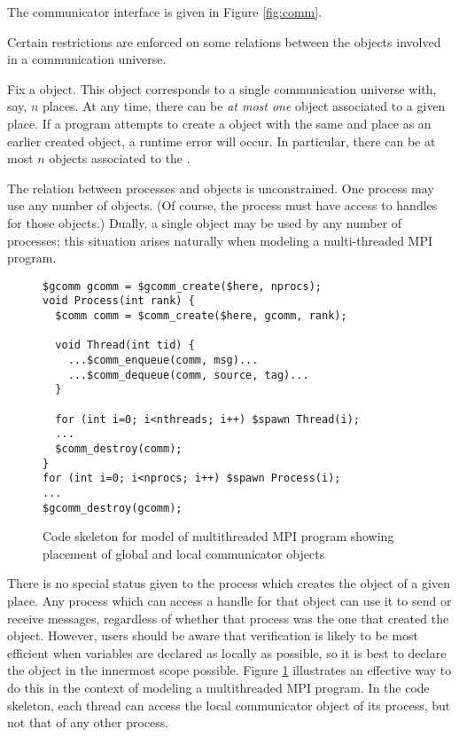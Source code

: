 The communicator interface is given in Figure \ref{fig:comm}.

Certain restrictions are enforced on some relations between the
objects involved in a communication universe.

Fix a \cgcomm{} object.  This object corresponds to a single
communication universe with, say, $n$ places.  At any time, there can
be \emph{at most one} \ccomm{} object associated to a given place.  If
a program attempts to create a \ccomm{} object with the same \cgcomm{}
and place as an earlier created \ccomm{} object, a runtime error will
occur.  In particular, there can be at most $n$ \ccomm{} objects
associated to the \cgcomm.

The relation between processes and \ccomm{} objects is unconstrained.
One process may use any number of \ccomm{} objects.  (Of course, the
process must have access to handles for those \ccomm{} objects.)
Dually, a single \ccomm{} object may be used by any number of
processes; this situation arises naturally when modeling a
multi-threaded MPI program.

\begin{figure}
  \begin{small}
\begin{verbatim}
$gcomm gcomm = $gcomm_create($here, nprocs);
void Process(int rank) {
  $comm comm = $comm_create($here, gcomm, rank);

  void Thread(int tid) {
    ...$comm_enqueue(comm, msg)...
    ...$comm_dequeue(comm, source, tag)...
  }

  for (int i=0; i<nthreads; i++) $spawn Thread(i);
  ...
  $comm_destroy(comm);
}
for (int i=0; i<nprocs; i++) $spawn Process(i);
...
$gcomm_destroy(gcomm);
\end{verbatim}
  \end{small}
  \caption{Code skeleton for model of multithreaded MPI program
    showing placement of global and local communicator objects}
  \label{fig:mpi-threads-comm}
\end{figure}

There is no special status given to the process which creates the
\ccomm{} object of a given place.  Any process which can access a
handle for that \ccomm{} object can use it to send or receive
messages, regardless of whether that process was the one that created
the \ccomm{} object.  However, users should be aware that verification
is likely to be most efficient when variables are declared as locally
as possible, so it is best to declare the \ccomm{} object in the
innermost scope possible.  Figure \ref{fig:mpi-threads-comm}
illustrates an effective way to do this in the context of modeling a
multithreaded MPI program.  In the code skeleton, each thread can
access the local communicator object of its process, but not that of
any other process.

